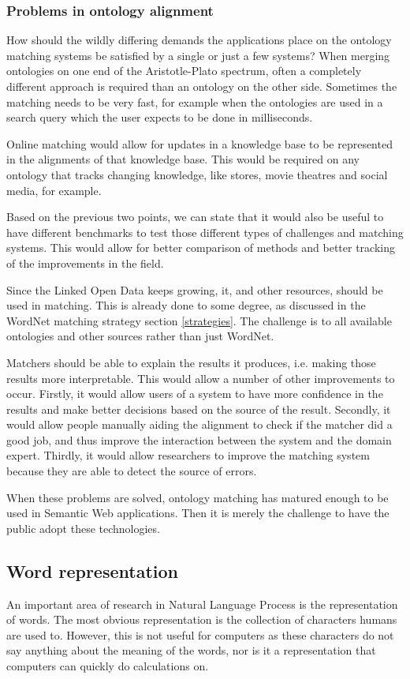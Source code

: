 \documentclass{article}
\begin{document}
 \subsubsection{Problems in ontology alignment}
 How should the wildly differing demands the applications place on the ontology matching systems be satisfied by a single or just a few systems? When merging ontologies on one end of the Aristotle-Plato spectrum, often a completely different approach is required than an ontology on the other side. Sometimes the matching needs to be very fast, for example when the ontologies are used in a search query which the user expects to be done in milliseconds.
 
 Online matching would allow for updates in a knowledge base to be represented in the alignments of that knowledge base. This would be required on any ontology that tracks changing knowledge, like stores, movie theatres and social media, for example.
 
 Based on the previous two points, we can state that it would also be useful to have different benchmarks to test those different types of challenges and matching systems. This would allow for better comparison of methods and better tracking of the improvements in the field.
 
 Since the Linked Open Data keeps growing, it, and other resources, should be used in matching. This is already done to some degree, as discussed in the WordNet matching strategy section \ref{strategies}. The challenge is to all available ontologies and other sources rather than just WordNet.
 
 Matchers should be able to explain the results it produces, i.e. making those results more interpretable. This would allow a number of other improvements to occur. Firstly, it would allow users of a system to have more confidence in the results and make better decisions based on the source of the result. Secondly, it would allow people manually aiding the alignment to check if the matcher did a good job, and thus improve the interaction between the system and the domain expert. Thirdly, it would allow researchers to improve the matching system because they are able to detect the source of errors.
 
 When these problems are solved, ontology matching has matured enough to be used in Semantic Web applications. Then it is merely the challenge to have the public adopt these technologies.
 
 \subsection{Word representation} \label{w2v}
 An important area of research in Natural Language Process is the representation of words. The most obvious representation is the collection of characters humans are used to. However, this is not useful for computers as these characters do not say anything about the meaning of the words, nor is it a representation that computers can quickly do calculations on.
 
\end{document}
